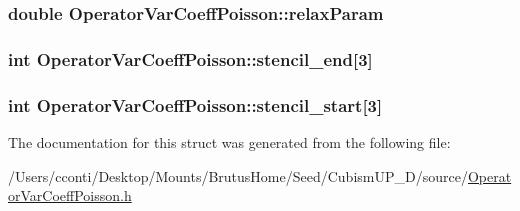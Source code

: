 \subsubsection[{relax\+Param}]{\setlength{\rightskip}{0pt plus 5cm}double Operator\+Var\+Coeff\+Poisson\+::relax\+Param}\label{struct_operator_var_coeff_poisson_acdb83c08518796d752d5d4ea6440da78}
\hypertarget{struct_operator_var_coeff_poisson_a94214a00c61d76a9e9fcd814da6926bc}{}
\subsubsection[{stencil\+\_\+end}]{\setlength{\rightskip}{0pt plus 5cm}int Operator\+Var\+Coeff\+Poisson\+::stencil\+\_\+end\mbox{[}3\mbox{]}}\label{struct_operator_var_coeff_poisson_a94214a00c61d76a9e9fcd814da6926bc}
\hypertarget{struct_operator_var_coeff_poisson_ab0aab16ef6f20e19b240eb373c940f68}{}
\subsubsection[{stencil\+\_\+start}]{\setlength{\rightskip}{0pt plus 5cm}int Operator\+Var\+Coeff\+Poisson\+::stencil\+\_\+start\mbox{[}3\mbox{]}}\label{struct_operator_var_coeff_poisson_ab0aab16ef6f20e19b240eb373c940f68}


The documentation for this struct was generated from the following file\+:\begin{DoxyCompactItemize}
\item 
/\+Users/cconti/\+Desktop/\+Mounts/\+Brutus\+Home/\+Seed/\+Cubism\+U\+P\+\_\+D/source/\hyperlink{_operator_var_coeff_poisson_8h}{Operator\+Var\+Coeff\+Poisson.\+h}\end{DoxyCompactItemize}

